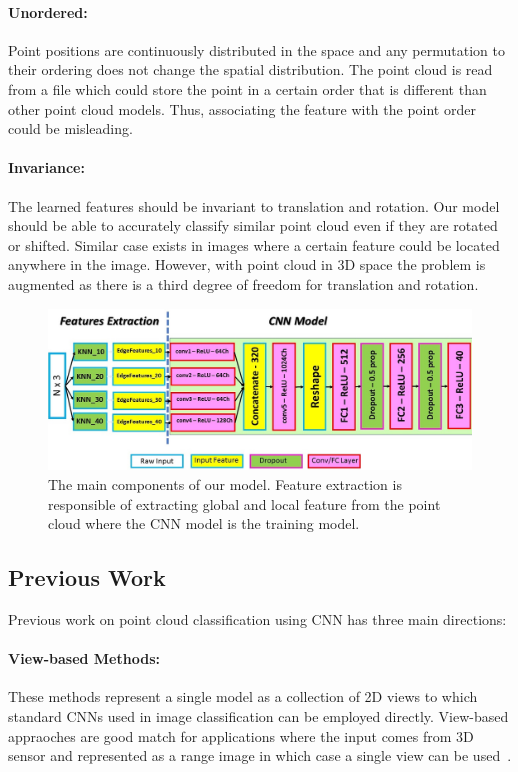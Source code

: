 \paragraph{Unordered:} Point positions are continuously distributed in the space and any permutation to their ordering does not change the spatial distribution. The point cloud is read from a file which could store the point in a certain order that is different than other point cloud models. Thus, associating the feature with the point order could be misleading.
\paragraph{Invariance:} The learned features should be invariant to translation and rotation. Our model should be able to accurately classify similar point cloud even if they are rotated or shifted. Similar case exists in images where a certain feature could be located anywhere in the image. However, with point cloud in 3D space the problem is augmented as there is a third degree of freedom for translation and rotation. 

\begin{figure}[!tbh]
\includegraphics[width=1.0\textwidth]{fig/model1.JPG}
\caption{The main components of our model. Feature extraction is responsible of extracting global and local feature from the point cloud where the CNN model is the training model.}
\label{fig:model1}
\end{figure}


\subsection{Previous Work}
Previous work on point cloud classification using CNN has three main directions:
\paragraph{View-based Methods:}
These methods represent a single model as a collection of 2D views to which standard CNNs used in image classification can be employed directly. View-based appraoches are good match for applications where the input comes from 3D sensor and represented as a range image in which case a single view can be used~\citep{wei2016dense}. 

